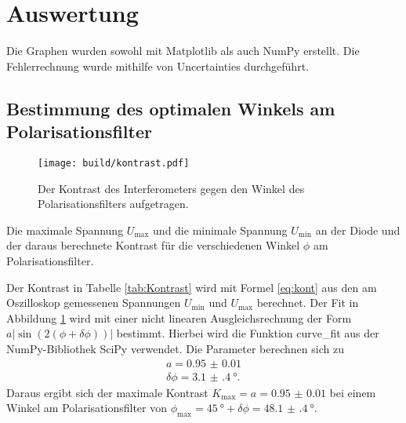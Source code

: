 \section{Auswertung}
\label{sec:Auswertung}
Die Graphen wurden sowohl mit Matplotlib \cite{matplotlib} als auch NumPy \cite{numpy} erstellt. Die
Fehlerrechnung wurde mithilfe von Uncertainties \cite{uncertainties} durchgeführt.
\subsection{Bestimmung des optimalen Winkels am Polarisationsfilter}
\label{ssec:polar}
\begin{figure}
	\centering
	\texttt{[image: build/kontrast.pdf]}
	\caption{Der Kontrast des Interferometers gegen den Winkel des Polarisationsfilters aufgetragen.}
	\label{fig:kontrast}
\end{figure}
\begin{table}
	\centering
	\caption{Die maximale Spannung $U_\text{max}$ und die minimale Spannung $U_\text{min}$ an der Diode und der daraus berechnete Kontrast für die verschiedenen Winkel $\phi$ am Polarisationsfilter.}
	
\end{table}
Der Kontrast in Tabelle \ref{tab:Kontrast} wird mit Formel \eqref{eq:kont} aus den am Oszilloskop gemessenen Spannungen $U_\text{min}$ und $U_\text{max}$ berechnet. Der Fit in Abbildung \ref{fig:kontrast} wird mit einer nicht linearen Ausgleichsrechnung der Form $a |\sin(2(\phi+\delta\phi))|$ bestimmt. Hierbei wird die Funktion curve\_fit aus der NumPy-Bibliothek SciPy \cite{scipy} verwendet. Die Parameter berechnen sich zu
\begin{gather*}
a=\num{0.95(1)}\\
\delta\phi=\SI{3.1(4)}{\degree}.
\end{gather*}
Daraus ergibt sich der maximale Kontrast $K_\text{max}=a=\num{0.95(1)}$ bei einem Winkel am Polarisationsfilter von $\phi_\text{max}=\SI{45}{\degree}+\delta\phi=\SI{48.1(4)}{\degree}$.

